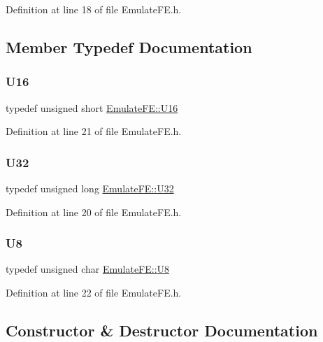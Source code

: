Definition at line 18 of file Emulate\+F\+E.\+h.



\subsection{Member Typedef Documentation}
\mbox{\label{classEmulateFE_ae3af71615d90d5e7ee4de109e8a79c5f}} 
\subsubsection{\texorpdfstring{U16}{U16}}
{\footnotesize\ttfamily typedef unsigned short \hyperlink{classEmulateFE_ae3af71615d90d5e7ee4de109e8a79c5f}{Emulate\+F\+E\+::\+U16}}



Definition at line 21 of file Emulate\+F\+E.\+h.

\mbox{\label{classEmulateFE_abc39ad2fcef684d453760193ac4ddd49}} 
\subsubsection{\texorpdfstring{U32}{U32}}
{\footnotesize\ttfamily typedef unsigned long \hyperlink{classEmulateFE_abc39ad2fcef684d453760193ac4ddd49}{Emulate\+F\+E\+::\+U32}}



Definition at line 20 of file Emulate\+F\+E.\+h.

\mbox{\label{classEmulateFE_a8aa884f739fca2855ff8fb6bf3cddcff}} 
\subsubsection{\texorpdfstring{U8}{U8}}
{\footnotesize\ttfamily typedef unsigned char \hyperlink{classEmulateFE_a8aa884f739fca2855ff8fb6bf3cddcff}{Emulate\+F\+E\+::\+U8}}



Definition at line 22 of file Emulate\+F\+E.\+h.



\subsection{Constructor \& Destructor Documentation}
\mbox{\label{classEmulateFE_ac6242fca0d5c30477153d1d33d5f990d}} 
